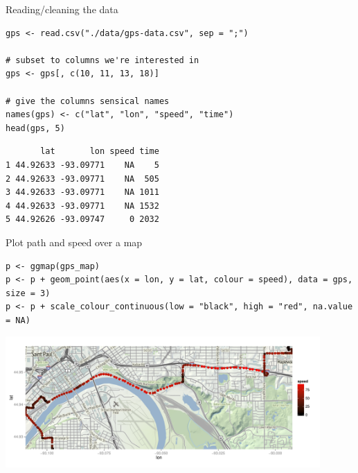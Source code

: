 \documentclass[sans,aspectratio=169,presentation,bigger,fleqn]{beamer}
\begin{document}
\begin{frame}[fragile,label=sec-26]{Reading/cleaning the data}
 \scriptsize
\begin{verbatim}
gps <- read.csv("./data/gps-data.csv", sep = ";")

# subset to columns we're interested in
gps <- gps[, c(10, 11, 13, 18)]

# give the columns sensical names
names(gps) <- c("lat", "lon", "speed", "time")
head(gps, 5)
\end{verbatim}

\begin{verbatim}
       lat       lon speed time
1 44.92633 -93.09771    NA    5
2 44.92633 -93.09771    NA  505
3 44.92633 -93.09771    NA 1011
4 44.92633 -93.09771    NA 1532
5 44.92626 -93.09747     0 2032
\end{verbatim}

\normalsize
\end{frame}
\begin{frame}[fragile,label=sec-27]{Plot path and speed over a map}
 \scriptsize

\begin{verbatim}
p <- ggmap(gps_map)
p <- p + geom_point(aes(x = lon, y = lat, colour = speed), data = gps, size = 3)
p <- p + scale_colour_continuous(low = "black", high = "red", na.value = NA)
\end{verbatim}

\begin{center}
\includegraphics[height=5cm]{./plots/gps-map-over.pdf}
\end{center}

\normalsize
\end{frame}
\end{document}
